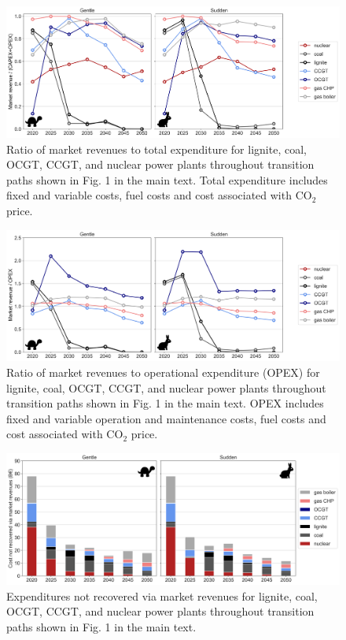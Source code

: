 \documentclass[3p]{elsarticle} %
\begin{document}
\begin{figure}[!h]
\centering
\includegraphics[width=\columnwidth]{../figures/revenue_vs_expenditure_Base.png}
\caption{Ratio of market revenues to total expenditure for lignite, coal, OCGT, CCGT, and nuclear power plants throughout transition paths shown in Fig. 1 in the main text. Total expenditure includes fixed and variable costs, fuel costs and cost associated with CO$_2$ price. } \label{fig_revenues_vs_expenditure} 
\end{figure}

\begin{figure}[!h]
\centering
\includegraphics[width=\columnwidth]{../figures/revenue_vs_variablecost_Base.png}
\caption{Ratio of market revenues to operational expenditure (OPEX) for lignite, coal, OCGT, CCGT, and nuclear power plants throughout transition paths shown in Fig. 1 in the main text. OPEX includes fixed and variable operation and maintenance costs, fuel costs and cost associated with CO$_2$ price. } \label{fig_revenues_vs_variable} 
\end{figure}


\begin{figure}[!h]
\centering
\includegraphics[width=\columnwidth]{../figures/deficit_Base.png}
\caption{Expenditures not recovered via market revenues for lignite, coal, OCGT, CCGT, and nuclear power plants throughout transition paths shown in Fig. 1 in the main text.} \label{fig_deficit} 
\end{figure}
\end{document}
